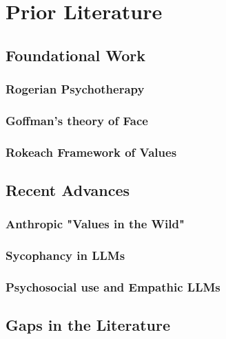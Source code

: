 \section{Prior Literature}

\subsection{Foundational Work}
\subsubsection{Rogerian Psychotherapy}
\lipsum[8-9]
\subsubsection{Goffman's theory of Face}
\lipsum[9-10]
\subsubsection{Rokeach Framework of Values}
\lipsum[10-11]

\subsection{Recent Advances}
\subsubsection{Anthropic "Values in the Wild"}
\lipsum[10-11]
\subsubsection{Sycophancy in LLMs}
\lipsum[12-14]
\subsubsection{Psychosocial use and Empathic LLMs}
\lipsum[14-16]

\subsection{Gaps in the Literature}
\lipsum[16-18]